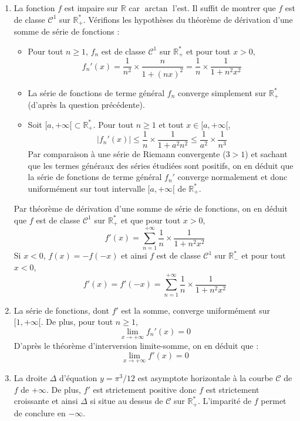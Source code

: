 \documentclass[a4paper,10pt]{report}
\begin{document}
\begin{enumerate}
\item La fonction $f$ est impaire sur $\mathbb{R}$ car $\arctan$ l'est. Il suffit de montrer que $f$ est de classe $\mathcal{C}^1$ sur $\mathbb{R}_+^{*}$. Vérifions les hypothèses du théorème de dérivation d'une somme de série de fonctions :
\begin{itemize}
\item Pour tout $n \geq 1$, $f_n$ est de classe $\mathcal{C}^1$ sur $\mathbb{R}_+^{*}$ et pour tout $x>0$,
$$ f_n'(x) = \dfrac{1}{n^2} \times \dfrac{n}{1+(nx)^2} = \dfrac{1}{n} \times \dfrac{1}{1+n^2x^2}$$
\item La série de fonctions de terme général $f_n$ converge simplement sur $\mathbb{R}_+^{*}$ (d'après la question précédente).
\item Soit $[a, + \infty[ \subset \mathbb{R}_+^{*}$. Pour tout $n \geq 1$ et tout $x \in [a, + \infty[$,
$$ \vert f_n'(x) \vert \leq \dfrac{1}{n} \times \dfrac{1}{1+a^2n^2} \leq \dfrac{1}{a^2} \times \dfrac{1}{n^3}$$
Par comparaison à une série de Riemann convergente ($3>1$) et sachant que les termes généraux des séries étudiées sont positifs, on en déduit que la série de fonctions de terme général $f_n'$ converge normalement et donc uniformément sur tout intervalle $[a,+ \infty[$ de $\mathbb{R}_+^{*}$.
\end{itemize}
Par théorème de dérivation d'une somme de série de fonctions, on en déduit que $f$ est de classe $\mathcal{C}^1$ sur $\mathbb{R}_+^{*}$ et que pour tout $x>0$,
$$ f'(x) = \sum_{n=1}^{+ \infty} \dfrac{1}{n} \times \dfrac{1}{1+n^2x^2}$$
Si $x<0$, $f(x)=-f(-x)$ et ainsi $f$ est de classe $\mathcal{C}^1$ sur $\mathbb{R}_{-}^*$ et pour tout $x<0$,
$$ f'(x)=f'(-x) = \sum_{n=1}^{+ \infty} \dfrac{1}{n} \times \dfrac{1}{1+n^2x^2}$$
\item La série de fonctions, dont $f'$ est la somme, converge uniformément sur $[1, + \infty[$. De plus, pour tout $n \geq 1$,
$$ \lim_{x \rightarrow + \infty} f_n'(x) = 0$$
D'après le théorème d'interversion limite-somme, on en déduit que :
$$ \lim_{x \rightarrow + \infty} f'(x) = 0$$
\item La droite $\Delta$ d'équation $y= \pi^3/12$ est asymptote horizontale à la courbe $\mathcal{C}$ de $f$ de $+ \infty$. De plus, $f'$ est strictement positive donc $f$ est strictement croissante et ainsi $\Delta$ si situe au dessus de $\mathcal{C}$ sur $\mathbb{R}_+^{*}$. L'imparité de $f$ permet de conclure en $- \infty$.
\end{enumerate}

\medskip
\end{document}
